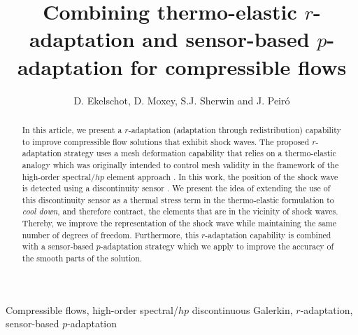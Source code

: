 \documentclass[review]{elsarticle}
\begin{document}
\begin{frontmatter}

\title{Combining thermo-elastic $r$-adaptation and sensor-based $p$-adaptation for compressible flows}

\author{D. Ekelschot, D. Moxey, S.J. Sherwin and J. Peir\'{o}}
\address{Imperial College London, South Kensington Campus, London}
\fntext[myfootnote]{}




\begin{abstract}
 In this article, we present a $r$-adaptation (adaptation through redistribution) capability to improve compressible flow solutions that exhibit shock waves. 	The proposed $r$-adaptation strategy uses a mesh deformation capability that relies on a thermo-elastic analogy which was originally intended to control mesh validity in the framework of the high-order spectral/$hp$ element approach \cite{Moxey2015}.  
 In this work, the position of the shock wave is detected using a discontinuity sensor \cite{Persson2006}.
We present the idea of extending the use of this discontinuity sensor as a thermal stress term in the thermo-elastic formulation to {\it cool down}, and therefore contract, the elements that are in the vicinity of shock waves. Thereby, we improve the representation of the shock wave while maintaining the same number of degrees of freedom. Furthermore, this $r$-adaptation capability is combined with a sensor-based $p$-adaptation strategy which we apply to improve the accuracy of the smooth parts of the solution.
\end{abstract}
\begin{keyword}
Compressible flows, high-order spectral/$hp$ discontinuous Galerkin, $r$-adaptation, sensor-based $p$-adaptation
\end{keyword}

\end{frontmatter}
\end{document}
